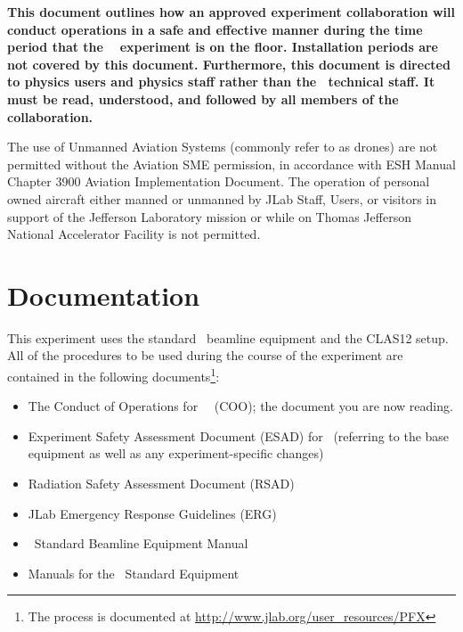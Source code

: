 \documentclass[11pt]{article}
\begin{document}
{\bf This document outlines how an approved experiment collaboration will conduct
operations in a safe and effective manner during the time period that the 
\EXPTS\  %
experiment is on the floor. Installation 
periods are not covered by this document. 
Furthermore, this document is directed to physics users and
physics staff rather than the \HALL\ technical staff.  It must be read, 
understood, and followed by all members of the collaboration. }

The use of Unmanned Aviation Systems (commonly refer to as drones) are not permitted without the Aviation SME permission, in accordance with ESH Manual Chapter 3900 Aviation Implementation Document. The operation of personal owned aircraft either manned or unmanned by JLab Staff, Users, or visitors in support of the Jefferson Laboratory mission or while on Thomas Jefferson National Accelerator Facility is not permitted.

\section{Documentation}
\indent

This experiment uses the standard \HALL\ beamline equipment and the CLAS12 setup. 
All of the procedures to be used during the course of the experiment are contained in the following
documents\footnote{The process is documented at \url{http://www.jlab.org/user_resources/PFX} }:

\begin{itemize}

\item  The Conduct of Operations for \HALL\ \EXPTS\
 (COO); the document you are now reading. 

\item   Experiment Safety Assessment Document (ESAD)
for \EXPTS\ (referring to the base equipment as well as any 
experiment-specific changes)

\item Radiation Safety Assessment Document (RSAD) 

\item JLab Emergency Response Guidelines (ERG) 

\item \HALL\ Standard Beamline Equipment Manual 

\item Manuals for the \EXPTSabrev\ Standard Equipment 

\end{itemize}
\end{document}
